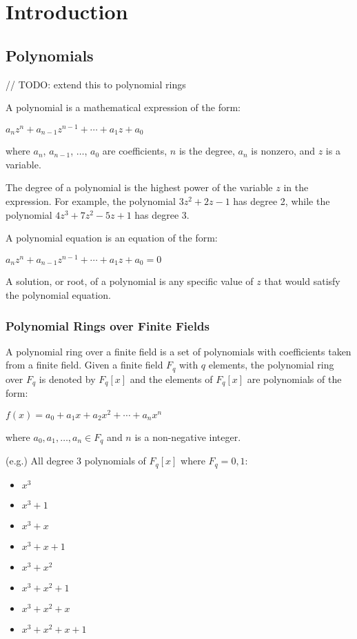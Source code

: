 \chapter{Introduction}

\section{Polynomials}
// TODO: extend this to polynomial rings

A polynomial is a mathematical expression of the form:

\begin{center}
$a_nz^n +a_{n-1}z^{n-1} + \cdots + a_1z+a_0$
\end{center}

where $a_n$, $a_{n-1}$, $\dots$, $a_0$ are coefficients, $n$ is the degree, $a_n$ is nonzero, and $z$ is a variable.

The degree of a polynomial is the highest power of the variable $z$ in the expression. For example, the polynomial $3z^2 + 2z - 1$ has degree 2, while the polynomial $4z^3 + 7z^2 - 5z + 1$ has degree 3.

A polynomial equation is an equation of the form:

\begin{center}
$a_nz^n +a_{n-1}z^{n-1} + \cdots + a_1z+a_0 = 0$
\end{center}

A solution, or root, of a polynomial is any specific value of $z$ that would satisfy the polynomial equation.

\subsection{Polynomial Rings over Finite Fields}
A polynomial ring over a finite field is a set of polynomials with coefficients taken from a finite field. Given a finite field $F_q$ with $q$ elements, the polynomial ring over $F_q$ is denoted by $F_q[x]$ and the elements of $F_q[x]$ are polynomials of the form:

\begin{center}
$f(x) = a_0 + a_1x + a_2x^2 + \cdots + a_nx^n$
\end{center}

where $a_0, a_1, \dots, a_n \in F_q$ and $n$ is a non-negative integer.

(e.g.) All degree 3 polynomials of $F_q[x]$ where $F_q = {0, 1}$:
\begin{multicols}{4}
\begin{itemize}
    \item $x^3$
    \item $x^3 + 1$
    \item $x^3 + x$
    \item $x^3 + x + 1$
    \item $x^3 + x^2$
    \item $x^3 + x^2 + 1$
    \item $x^3 + x^2 + x$
    \item $x^3 + x^2 + x + 1$
\end{itemize}
\end{multicols}

